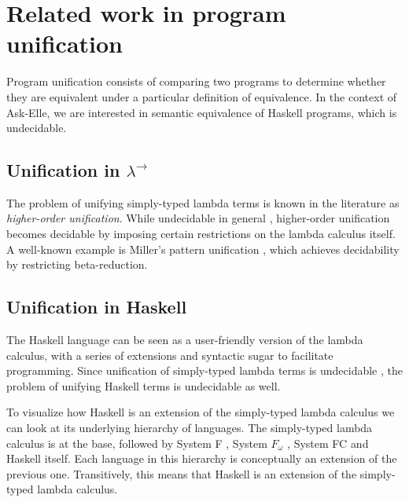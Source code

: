 




\section{Related work in program unification}
\label{sec:related-work-unification}

Program unification consists of comparing two programs to determine whether they are equivalent under a particular definition of equivalence. In the context of Ask-Elle, we are interested in semantic equivalence of Haskell programs, which is undecidable.

\subsection{Unification in $\lambda^\to$}

The problem of unifying simply-typed lambda terms is known in the literature as \emph{higher-order unification}. While undecidable in general \cite{2013barendregt}, higher-order unification becomes decidable by imposing certain restrictions on the lambda calculus itself. A well-known example is Miller's pattern unification \cite{1991miller}, which achieves decidability by restricting beta-reduction.

\subsection{Unification in Haskell}

The Haskell language can be seen as a user-friendly version of the lambda calculus, with a series of extensions and syntactic sugar to facilitate programming. Since unification of simply-typed lambda terms is undecidable \cite{2013barendregt}, the problem of unifying Haskell terms is undecidable as well.

To visualize how Haskell is an extension of the simply-typed lambda calculus we can look at its underlying hierarchy of languages. The simply-typed lambda calculus is at the base, followed by System F \cite{2002pierce}, System $F_\omega$ \cite{2002pierce}, System FC \cite{2007systemfc} and Haskell itself. Each language in this hierarchy is conceptually an extension of the previous one. Transitively, this means that Haskell is an extension of the simply-typed lambda calculus.

